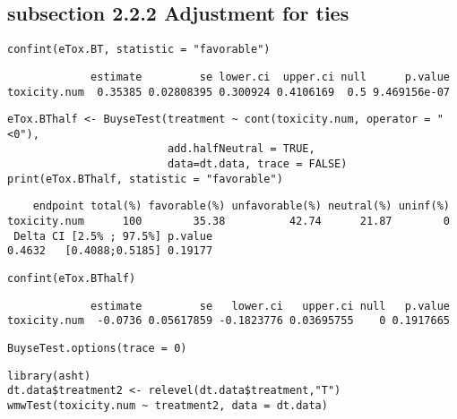 \documentclass[12pt]{article}
\begin{document}
\subsection{subsection 2.2.2 Adjustment for ties}
\label{sec:orga6f9824}

\lstset{language=r,label= ,caption= ,captionpos=b,numbers=none}
\begin{lstlisting}
confint(eTox.BT, statistic = "favorable")
\end{lstlisting}

\begin{verbatim}
             estimate         se lower.ci  upper.ci null      p.value
toxicity.num  0.35385 0.02808395 0.300924 0.4106169  0.5 9.469156e-07
\end{verbatim}



\lstset{language=r,label= ,caption= ,captionpos=b,numbers=none}
\begin{lstlisting}
eTox.BThalf <- BuyseTest(treatment ~ cont(toxicity.num, operator = "<0"),
                         add.halfNeutral = TRUE,
                         data=dt.data, trace = FALSE)
print(eTox.BThalf, statistic = "favorable")
\end{lstlisting}

\begin{verbatim}
    endpoint total(%) favorable(%) unfavorable(%) neutral(%) uninf(%)
toxicity.num      100        35.38          42.74      21.87        0
 Delta CI [2.5% ; 97.5%] p.value
0.4632   [0.4088;0.5185] 0.19177
\end{verbatim}


\lstset{language=r,label= ,caption= ,captionpos=b,numbers=none}
\begin{lstlisting}
confint(eTox.BThalf)
\end{lstlisting}

\begin{verbatim}
             estimate         se   lower.ci   upper.ci null   p.value
toxicity.num  -0.0736 0.05617859 -0.1823776 0.03695755    0 0.1917665
\end{verbatim}



\lstset{language=r,label= ,caption= ,captionpos=b,numbers=none}
\begin{lstlisting}
BuyseTest.options(trace = 0)
\end{lstlisting}

\lstset{language=r,label= ,caption= ,captionpos=b,numbers=none}
\begin{lstlisting}
library(asht)
dt.data$treatment2 <- relevel(dt.data$treatment,"T")
wmwTest(toxicity.num ~ treatment2, data = dt.data)
\end{lstlisting}
\end{document}

